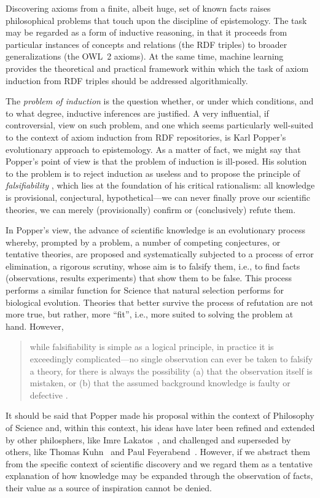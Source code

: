 \documentclass[a4paper]{article}
\newcounter{ex}
\begin{document}
Discovering axioms from a finite, albeit huge, set of known facts
raises philosophical problems that touch upon the discipline of epistemology.
The task may be regarded as a form of inductive reasoning, in that it proceeds
from particular instances of concepts and relations (the RDF triples)
to broader generalizations (the OWL~2 axioms).
At the same time, machine learning provides the theoretical and practical
framework within which the task of axiom induction from RDF triples
should be addressed algorithmically.

The \emph{problem of induction} is the question whether, or under which conditions,
and to what degree, inductive inferences are justified.
A very influential, if controversial, view on such problem, and one which seems
particularly well-suited to the context of axiom induction from RDF repositories,
is Karl Popper's evolutionary approach to epistemology. As a matter of fact,
we might say that Popper's point of view is that the problem of induction is ill-posed.
His solution to the problem is to reject induction as useless and to propose the principle
of \emph{falsifiability} \cite{Popper1935}, which lies at the foundation of his critical rationalism:
all knowledge is provisional, conjectural, hypothetical---we can never finally
prove our scientific theories, we can merely (provisionally) confirm or
(conclusively) refute them.

In Popper's view, the advance of scientific knowledge is an evolutionary process~\cite{Popper1972}
whereby, prompted by a problem, a number of competing conjectures, or tentative theories,
are proposed and systematically subjected to a process of error elimination,
a rigorous scrutiny, whose aim is to falsify them, i.e., to find facts (observations,
results experiments) that show them to be false.
This process performs a similar function for Science that natural selection performs
for biological evolution. Theories that better survive the process of refutation
are not more true, but rather, more ``fit'', i.e., more suited to solving
the problem at hand.
However,
\begin{quote}
while falsifiability is simple as a logical principle, in practice it is exceedingly
complicated---no single observation can ever be taken to falsify a theory,
for there is always the possibility (a) that the observation itself is mistaken,
or (b) that the assumed background knowledge is faulty or defective \cite{Thornton2013}.
\end{quote}

It should be said that Popper made his proposal within the context of Philosophy of Science
and, within this context, his ideas have later been refined and extended by other
philosphers, like Imre Lakatos~\cite{Lakatos1976}, and challenged and superseded by others,
like Thomas Kuhn~\cite{Kuhn1962} and Paul Feyerabend~\cite{Feyerabend1975}.
However, if we abstract them from the specific context of scientific discovery
and we regard them as a tentative explanation of how knowledge may be expanded
through the observation of facts, their value as a source of inspiration cannot be denied.
\end{document}
